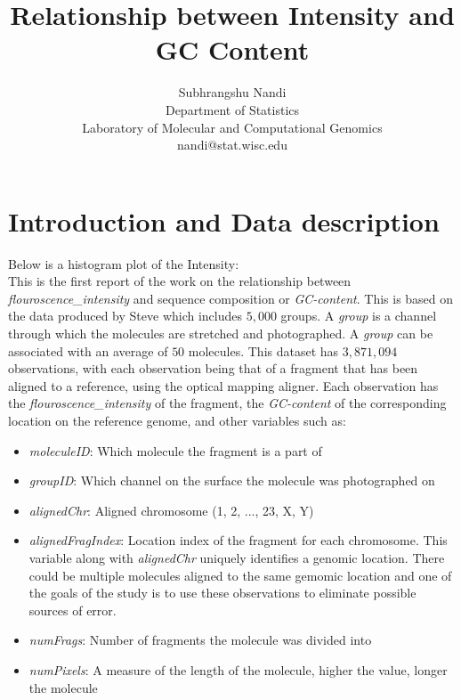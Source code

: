 \documentclass[11pt]{article}
\begin{document}


\title{Relationship between Intensity and GC Content}
\author{Subhrangshu Nandi\\
  Department of Statistics\\
  Laboratory of Molecular and Computational Genomics\\
  nandi@stat.wisc.edu}
\maketitle
\noindent
\section{Introduction and Data description}
Below is a histogram plot of the Intensity:\\
This is the first report of the work on the relationship between {\emph{flouroscence\_intensity}} and sequence composition or {\emph{GC-content}}. This is based on the data produced by Steve which includes $5,000$ groups. A {\emph{group}} is a channel through which the molecules are stretched and photographed. A {\emph{group}} can be associated with an average of $50$ molecules. This dataset has $3,871,094$ observations, with each observation being that of a fragment that has been aligned to a reference, using the optical mapping aligner. Each observation has the {\emph{flouroscence\_intensity}} of the fragment, the {\emph{GC-content}} of the corresponding location on the reference genome, and other variables such as:
\begin{itemize}
\item
{\emph{moleculeID}}: Which molecule the fragment is a part of
\item
{\emph{groupID}}: Which channel on the surface the molecule was photographed on
\item
{\emph{alignedChr}}: Aligned chromosome (1, 2, ..., 23, X, Y)
\item
{\emph{alignedFragIndex}}: Location index of the fragment for each chromosome. This variable along with {\emph{alignedChr}} uniquely identifies a genomic location. There could be multiple molecules aligned to the same gemomic location and one of the goals of the study is to use these observations to eliminate possible sources of error.
\item
{\emph{numFrags}}: Number of fragments the molecule was divided into
\item
{\emph{numPixels}}: A measure of the length of the molecule, higher the value, longer the molecule
\end{itemize}
\end{document}
